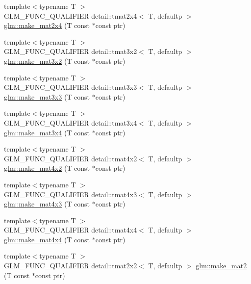 \begin{DoxyCompactItemize}
\item 
{\footnotesize template$<$typename T $>$ }\\G\+L\+M\+\_\+\+F\+U\+N\+C\+\_\+\+Q\+U\+A\+L\+I\+F\+I\+ER detail\+::tmat2x4$<$ T, defaultp $>$ \hyperlink{group__gtc__type__ptr_ga174a43e8913682834de9cd918e36df25}{glm\+::make\+\_\+mat2x4} (T const $\ast$const ptr)
\item 
{\footnotesize template$<$typename T $>$ }\\G\+L\+M\+\_\+\+F\+U\+N\+C\+\_\+\+Q\+U\+A\+L\+I\+F\+I\+ER detail\+::tmat3x2$<$ T, defaultp $>$ \hyperlink{group__gtc__type__ptr_gaa40868af4de8c5ed5470fdcc9985dbfc}{glm\+::make\+\_\+mat3x2} (T const $\ast$const ptr)
\item 
{\footnotesize template$<$typename T $>$ }\\G\+L\+M\+\_\+\+F\+U\+N\+C\+\_\+\+Q\+U\+A\+L\+I\+F\+I\+ER detail\+::tmat3x3$<$ T, defaultp $>$ \hyperlink{group__gtc__type__ptr_gaf8ba0a0a523423ae1149a1c2d90eb337}{glm\+::make\+\_\+mat3x3} (T const $\ast$const ptr)
\item 
{\footnotesize template$<$typename T $>$ }\\G\+L\+M\+\_\+\+F\+U\+N\+C\+\_\+\+Q\+U\+A\+L\+I\+F\+I\+ER detail\+::tmat3x4$<$ T, defaultp $>$ \hyperlink{group__gtc__type__ptr_gaa0c07ac459a5e16374aa12e3b35ee043}{glm\+::make\+\_\+mat3x4} (T const $\ast$const ptr)
\item 
{\footnotesize template$<$typename T $>$ }\\G\+L\+M\+\_\+\+F\+U\+N\+C\+\_\+\+Q\+U\+A\+L\+I\+F\+I\+ER detail\+::tmat4x2$<$ T, defaultp $>$ \hyperlink{group__gtc__type__ptr_gae4ad99adfe4fb195a192712a71de901d}{glm\+::make\+\_\+mat4x2} (T const $\ast$const ptr)
\item 
{\footnotesize template$<$typename T $>$ }\\G\+L\+M\+\_\+\+F\+U\+N\+C\+\_\+\+Q\+U\+A\+L\+I\+F\+I\+ER detail\+::tmat4x3$<$ T, defaultp $>$ \hyperlink{group__gtc__type__ptr_ga37ec66362c22d86ad2ee11930b638c4a}{glm\+::make\+\_\+mat4x3} (T const $\ast$const ptr)
\item 
{\footnotesize template$<$typename T $>$ }\\G\+L\+M\+\_\+\+F\+U\+N\+C\+\_\+\+Q\+U\+A\+L\+I\+F\+I\+ER detail\+::tmat4x4$<$ T, defaultp $>$ \hyperlink{group__gtc__type__ptr_ga4b13ff6840a66d032724a9a1db50f704}{glm\+::make\+\_\+mat4x4} (T const $\ast$const ptr)
\item 
{\footnotesize template$<$typename T $>$ }\\G\+L\+M\+\_\+\+F\+U\+N\+C\+\_\+\+Q\+U\+A\+L\+I\+F\+I\+ER detail\+::tmat2x2$<$ T, defaultp $>$ \hyperlink{group__gtc__type__ptr_ga903422b2c346cbaccad3153a5a1f404c}{glm\+::make\+\_\+mat2} (T const $\ast$const ptr)

\end{DoxyCompactItemize}
